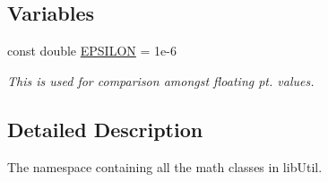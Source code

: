 \subsection*{\-Variables}
\begin{DoxyCompactItemize}
\item 
\hypertarget{namespaceutil_1_1math_a341939326d8a0061b87c80ad65ee2bbb}{const double \hyperlink{namespaceutil_1_1math_a341939326d8a0061b87c80ad65ee2bbb}{\-E\-P\-S\-I\-L\-O\-N} = 1e-\/6}\label{namespaceutil_1_1math_a341939326d8a0061b87c80ad65ee2bbb}

\begin{DoxyCompactList}\small\item\em \-This is used for comparison amongst floating pt. values. \end{DoxyCompactList}\end{DoxyCompactItemize}


\subsection{\-Detailed \-Description}
\-The namespace containing all the math classes in lib\-Util. 
